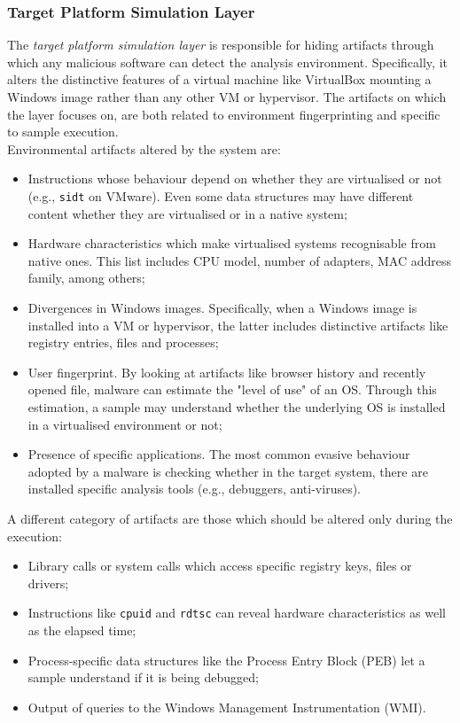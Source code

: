 \documentclass[LaM,binding=0.6cm]{sapthesis}
\begin{document}
\subsubsection{Target Platform Simulation Layer}
\label{subsec:targetplatformsimulation}
The \textit{target platform simulation layer} is responsible for hiding artifacts through which any malicious software can detect the analysis environment. Specifically, it alters the distinctive features of a virtual machine like VirtualBox mounting a Windows image rather than any other VM or hypervisor. The artifacts on which the layer focuses on, are both related to environment fingerprinting and specific to sample execution.\\
Environmental artifacts altered by the system are:
\begin{itemize}
\item Instructions whose behaviour depend on whether they are virtualised or not (e.g., \texttt{sidt} on VMware). Even some data structures may have different content whether they are virtualised or in a native system;
\item Hardware characteristics which make virtualised systems recognisable from native ones. This list includes CPU model, number of adapters, MAC address family, among others;
\item Divergences in Windows images. Specifically, when a Windows image is installed into a VM or hypervisor, the latter includes distinctive artifacts like registry entries, files and processes;
\item User fingerprint. By looking at artifacts like browser history and recently opened file, malware can estimate the "level of use" of an OS. Through this estimation, a sample may understand whether the underlying OS is installed in a virtualised environment or not;
\item Presence of specific applications. The most common evasive behaviour adopted by a malware is checking whether in the target system, there are installed specific analysis tools (e.g., debuggers, anti-viruses).
\end{itemize} 
A different category of artifacts are those which should be altered only during the execution:
\begin{itemize}
\item Library calls or system calls which access specific registry keys, files or drivers;
\item Instructions like \texttt{cpuid} and \texttt{rdtsc} can reveal hardware characteristics as well as the elapsed time;
\item Process-specific data structures like the Process Entry Block (PEB) let a sample understand if it is being debugged;
\item Output of queries to the Windows Management Instrumentation (WMI).
\end{itemize}
\end{document}
